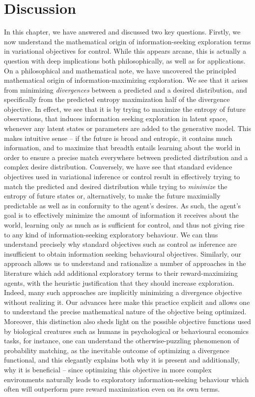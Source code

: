 \section{Discussion}

In this chapter, we have answered and discussed two key questions. Firstly, we now understand the mathematical origin of information-seeking exploration terms in variational objectives for control. While this appears arcane, this is actually a question with deep implications both philosophically, as well as for applications. On a philosophical and mathematical note, we have uncovered the principled mathematical origin of information-maximizing exploration. We see that it arises from minimizing \emph{divergences} between a predicted and a desired distribution, and specifically from the predicted entropy maximization half of the divergence objective. In effect, we see that it is by trying to maximize the entropy of future observations, that induces information seeking exploration in latent space, whenever any latent states or parameters are added to the generative model. This makes intuitive sense -- if the future is broad and entropic, it contains much information, and to maximize that breadth entails learning about the world in order to ensure a precise match everywhere between predicted distribution and a complex desire distribution. Conversely, we have see that standard evidence objectives used in variational inference or control result in effectively trying to match the predicted and desired distribution while trying to \emph{minimize} the entropy of future states or, alternatively, to make the future maximially predictable as well as in conformity to the agent's desires. As such, the agent's goal is to effectively minimize the amount of information it receives about the world, learning only as much as is sufficient for control, and thus not giving rise to any kind of information-seeking exploratory behaviour. We can thus understand precisely why standard objectives such as control as inference are insufficient to obtain information seeking behavioural objectives. Similarly, our approach allows us to understand and rationalize a number of approaches in the literature \citep{sun_planning_2011,oudeyer2009intrinsic,klyubin2005empowerment} which add additional exploratory terms to their reward-maximizing agents, with the heuristic justification that they should increase exploration. Indeed, many such approaches are implicitly minimizing a divergence objective without realizing it. Our advances here make this practice explicit and allows one to understand the precise mathematical nature of the objective being optimized. Moreover, this distinction also sheds light on the possible objective functions used by biological creatures such as humans in psychological or behavioural economics tasks, for instance, one can understand the otherwise-puzzling phenomenon of probability matching, as the inevitable outcome of optimizing a divergence functional, and this elegantly explains both why it is present and additionally, why it is beneficial -- since optimizing this objective in more complex environments naturally leads to exploratory information-seeking behaviour which often will outperform pure reward maximization even on its own terms.


